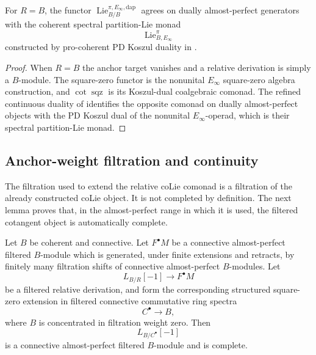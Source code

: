 \begin{proposition}
\label{prop:bnla-one-object-spectral-partition-monad}
For $R=B$, the functor
$\operatorname{Lie}^{\pi,E_\infty,\mathrm{dap}}_{B/B}$ agrees on dually
almost-perfect generators with the coherent spectral partition-Lie monad
\[
    \operatorname{Lie}^{\pi}_{B,E_\infty}
\]
constructed by pro-coherent PD Koszul duality in
\cite{BrantnerCamposNuiten2025}.
\end{proposition}

\begin{proof}
When $R=B$ the anchor target vanishes and a relative derivation is simply a
$B$-module.  The square-zero functor is the nonunital $E_\infty$ square-zero
algebra construction, and
$\operatorname{cot}\operatorname{sqz}$ is its Koszul-dual coalgebraic
comonad.  The refined continuous duality of
\cite{BrantnerCamposNuiten2025} identifies the opposite comonad on dually
almost-perfect objects with the PD Koszul dual of the nonunital
$E_\infty$-operad, which is their spectral partition-Lie monad.
\end{proof}

\subsection{Anchor-weight filtration and continuity}

The filtration used to extend the relative coLie comonad is a filtration of
the already constructed coLie object.  It is not completed by definition.
The next lemma proves that, in the almost-perfect range in which it is used,
the filtered cotangent object is automatically complete.

\begin{lemma}
\label{lem:bnla-filtered-square-zero-cotangent-finiteness}
Let $B$ be coherent and connective.  Let $F^\bullet M$ be a connective
almost-perfect filtered $B$-module which is generated, under finite extensions
and retracts, by finitely many filtration shifts of connective almost-perfect
$B$-modules.  Let
\[
    L_{B/R}[-1]\longrightarrow F^\bullet M
\]
be a filtered relative derivation, and form the corresponding structured
square-zero extension in filtered connective commutative ring spectra
\[
    C^\bullet\longrightarrow B,
\]
where $B$ is concentrated in filtration weight zero.  Then
\[
    L_{B/C^\bullet}[-1]
\]
is a connective almost-perfect filtered $B$-module and is complete.
\end{lemma}

